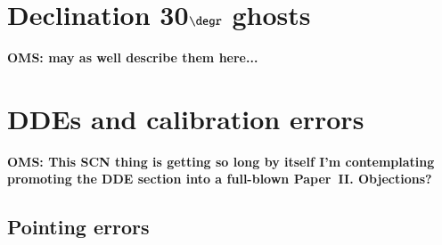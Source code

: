 \documentclass{aa}
\begin{document}
\begin{figure}
\end{figure}

\section{Declination 30$\degr$ ghosts}

{\bf OMS: may as well describe them here...}

\section{DDEs and calibration errors}
\label{sec:dde}

{\bf OMS: This SCN thing is getting so long by itself I'm contemplating promoting the DDE section into a full-blown Paper~II. Objections?}

\subsection{Pointing errors}
\end{document}
